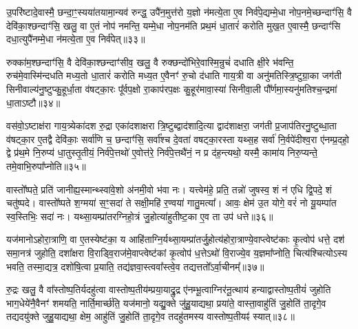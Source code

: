 उ॒परि॑ष्टादे॒वास्मै॒ छन्दा॒ꣳ॒स्यया॑तयामा॒न्यव॑ रुन्द्ध॒ उपै॑न॒मुत्त॑रो य॒ज्ञो न॑मत्ये॒ता ए॒व निर्व॑पे॒द्यम्मे॒धा नोप॒नमे॒च्छन्दाꣳ॑सि॒ वै देवि॑का॒श्छन्दाꣳ॑सि॒ खलु॒ वा ए॒तं नोप॑ नमन्ति॒ यम्मे॒धा नोप॒नम॑ति प्रथ॒मं धा॒तारं॑ करोति मुख॒त ए॒वास्मै॒ छन्दाꣳ॑सि दधा॒त्युपै॑नम्मे॒धा न॑मत्ये॒ता ए॒व निर्व॑पेत्॥३३॥

रुक्का॑म॒श्छन्दाꣳ॑सि॒ वै देवि॑का॒श्छन्दाꣳ॑सीव॒ खलु॒ वै रुक्छन्दो॑भिरे॒वास्मि॒न्रुचं॑ दधाति क्षी॒रे भ॑वन्ति॒ रुच॑मे॒वास्मि॑न्दधति मध्य॒तो धा॒तारं॑ करोति मध्य॒त ए॒वैनꣳ॑ रु॒चो द॑धाति गाय॒त्री वा अनु॑मतिस्त्रि॒ष्टुग्रा॒का जग॑ती सिनीवाल्य॑नु॒ष्टुप्कु॒हूर्धा॒ता व॑षट्का॒रः पू᳚र्वप॒क्षो रा॒काप॑रप॒क्षः कु॒हूर॑मावा॒स्या॑ सिनीवा॒ली पौ᳚र्णमा॒स्यनु॑मतिश्च॒न्द्रमा॑ धा॒ता\-ऽष्टौ॥३४॥

वस॑वो॒\-ऽष्टाक्ष॑रा गाय॒त्र्येका॑दश रु॒द्रा एका॑दशाक्षरा त्रि॒ष्टुब्द्वाद॑शादि॒त्या द्वाद॑शाक्षरा॒ जग॑ती प्र॒जाप॑तिरनु॒ष्टुब्धा॒ता व॑षट्का॒र ए॒तद्वै देवि॑काः॒ सर्वा॑णि च॒ छन्दाꣳ॑सि॒ सर्वा᳚श्च दे॒वता॑ वषट्का॒रस्ता यथ्स॒ह सर्वा॑ नि॒र्वपे॑दीश्व॒रा ए॑नम्प्र॒दहो॒ द्वे प्र॑थ॒मे नि॒रुप्य॑ धा॒तुस्तृ॒तीयं॒ निर्व॑पे॒त्तथो॑ ए॒वोत्त॑रे॒ निर्व॑पे॒त्तथै॑नं॒ न प्र द॑ह॒न्त्यथो॒ यस्मै॒ कामा॑य निरु॒प्यन्ते॒ तमे॒वाभि॒रुपा᳚प्नोति॥३५॥

{\anuvakamend[{प॒शुका॑म॒श्छन्दाꣳ॑सि॒ वै देवि॑का॒श्छन्दाꣳ॑सि॒ ग्राम॑ङ्कल्पयत्ये॒ता ए॒व निरु॑त्त॒मन्धा॒तारं॑ करोति मे॒धा न॑मत्ये॒ता ए॒व निर्व॑पेद॒ष्टौ द॑हन्ति॒ नव॑ च॥९॥ देविकाः प्रजाकामो मिथुनी पशुकाम}]}

वास्तो᳚ष्पते॒ प्रति॑ जानीह्य॒स्मान्थ्स्वा॑वे॒शो अ॑नमी॒वो भ॑वा नः। यत्त्वेम॑हे॒ प्रति॒ तन्नो॑ जुषस्व॒ शं न॑ एधि द्वि॒पदे॒ शं चतु॑ष्पदे। वास्तो᳚ष्पते श॒ग्मया॑ स॒ꣳ॒सदा॑ ते सक्षी॒महि॑ र॒ण्वया॑ गातु॒मत्या᳚। आवः॒ क्षेम॑ उ॒त योगे॒ वरं॑ नो यू॒यम्पा॑त स्व॒स्तिभिः॒ सदा॑ नः। यथ्सा॒यम्प्रा॑तरग्निहो॒त्रं जु॒होत्या॑हुतीष्ट॒का ए॒व ता उप॑ धत्ते॥३६॥

यज॑मानो\-ऽहोरा॒त्राणि॒ वा ए॒तस्येष्ट॑का॒ य आहि॑ताग्नि॒र्यथ्सा॒यम्प्रा॑तर्जु॒होत्य॑होरा॒त्राण्ये॒वाप्त्वेष्ट॑काः कृ॒त्वोप॑ धत्ते॒ दश॑ समा॒नत्र॑ जुहोति॒ दशा᳚क्षरा वि॒राड्वि॒राज॑मे॒वाप्त्वेष्ट॑कां कृ॒त्वोप॑ ध॒त्ते\-ऽथो॑ वि॒राज्ये॒व य॒ज्ञमा᳚प्नोति॒ चित्य॑श्चित्यो\-ऽस्य भवति॒ तस्मा॒द्यत्र॒ दशो॑षि॒त्वा प्र॒याति॒ तद्य॑ज्ञवा॒स्त्ववा᳚स्त्वे॒व तद्यत्ततो᳚\-ऽर्वा॒चीनम्᳚॥३७॥

रु॒द्रः खलु॒ वै वा᳚स्तोष्प॒तिर्यदहु॑त्वा वास्तोष्प॒तीय॑म्प्रया॒याद्रु॒द्र ए॑नम्भू॒त्वाग्निर॑नू॒त्थाय॑ हन्याद्वास्तोष्प॒तीयं॑ जुहोति भाग॒धेये॑नै॒वैनꣳ॑ शमयति॒ नार्ति॒मार्च्छ॑ति॒ यज॑मानो॒ यद्यु॒क्ते जु॑हु॒याद्यथा॒ प्रया॑ते॒ वास्ता॒वाहु॑तिं जु॒होति॑ ता॒दृगे॒व तद्यदयु॑क्ते जुहु॒याद्यथा॒ क्षेम॒ आहु॑तिं जु॒होति॑ ता॒दृगे॒व तदहु॑तमस्य वास्तोष्प॒तीयꣴ॑ स्यात्॥३८॥

